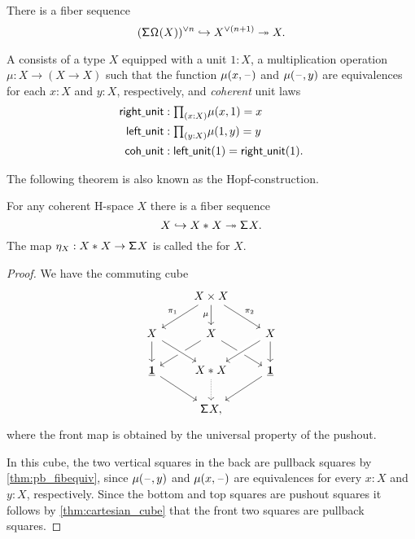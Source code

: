 \begin{cor}
There is a fiber sequence
\begin{equation*}
(\mathsf{\Sigma}^{}\mathsf{\Omega}^{}(X))^{\vee n} \hookrightarrow X^{\vee (n+1)} \twoheadrightarrow X.
\end{equation*}
\end{cor}

\begin{defn}\label{defn:coh_hspace}
A  consists of a type $X$ equipped with a unit $1:X$, a multiplication operation $\mu:X \to (X \to X)$ such that the function $\mu(x,\mathord{\hspace{1pt}\text{--}\hspace{1pt}})$ and $\mu(\mathord{\hspace{1pt}\text{--}\hspace{1pt}},y)$ are equivalences for each $x:X$ and $y:X$, respectively, and \emph{coherent} unit laws
\begin{align*}
\mathsf{right\usc{}unit} & : \prd{x: X} \mu(x,1)= x \\
\mathsf{left\usc{}unit} & : \prd{y:X} \mu(1,y) = y \\
\mathsf{coh\usc{}unit} & : \mathsf{left\usc{}unit}(1)=\mathsf{right\usc{}unit}(1).
\end{align*}
\end{defn}

The following theorem is also known as the Hopf-construction.

\begin{thm}\label{thm:hopf_construction}
For any coherent H-space $X$ there is a fiber sequence
\begin{equation*}
X \hookrightarrow {X}\ast_{}{X} \twoheadrightarrow \mathsf{\Sigma}^{} X.
\end{equation*}
The map $\eta_X:{X}\ast_{}{X}\to \mathsf{\Sigma}^{} X$ is called the  for $X$.
\end{thm}

\begin{proof}
We have the commuting cube
\begin{equation*}
\begin{tikzcd}
& X \times X \arrow[dl,swap,"\pi_1"] \arrow[d,swap,"\mu"] \arrow[dr,"\pi_2"] \\
X \arrow[d] & X \arrow[dl] \arrow[dr] & X \arrow[dl,crossing over] \arrow[d] \\
\unit \arrow[dr] & \join{X}{X} \arrow[from=ul,crossing over] \arrow[d,densely dotted] & \unit \arrow[dl] \\
& \susp X,
\end{tikzcd}
\end{equation*}
where the front map is obtained by the universal property of the pushout.

In this cube, the two vertical squares in the back are pullback squares by \cref{thm:pb_fibequiv}, since $\mu(\mathord{\hspace{1pt}\text{--}\hspace{1pt}},y)$ and $\mu(x,\mathord{\hspace{1pt}\text{--}\hspace{1pt}})$ are equivalences for every $x:X$ and $y:X$, respectively. Since the bottom and top squares are pushout squares it follows by \cref{thm:cartesian_cube} that the front two squares are pullback squares.
\end{proof}

